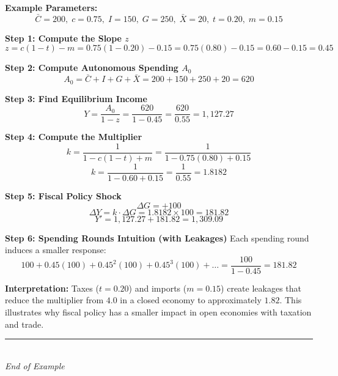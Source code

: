 \documentclass[12pt]{article}
\begin{document}
\textbf{Example Parameters:}
\[
\bar{C} = 200, \; c = 0.75, \; I = 150, \; G = 250, \; \bar{X} = 20, \; t = 0.20, \; m = 0.15
\]

\textbf{Step 1: Compute the Slope \( z \)}
\[
z = c(1 - t) - m = 0.75(1 - 0.20) - 0.15 = 0.75(0.80) - 0.15 = 0.60 - 0.15 = \boxed{0.45}
\]

\textbf{Step 2: Compute Autonomous Spending \( A_0 \)}
\[
A_0 = \bar{C} + I + G + \bar{X} = 200 + 150 + 250 + 20 = \boxed{620}
\]

\textbf{Step 3: Find Equilibrium Income}
\[
Y = \frac{A_0}{1 - z} = \frac{620}{1 - 0.45} = \frac{620}{0.55} = \boxed{1{,}127.27}
\]

\textbf{Step 4: Compute the Multiplier}
\[
k = \frac{1}{1 - c(1-t) + m} = \frac{1}{1 - 0.75(0.80) + 0.15}
\]
\[
k = \frac{1}{1 - 0.60 + 0.15} = \frac{1}{0.55} = \boxed{1.8182}
\]

\textbf{Step 5: Fiscal Policy Shock}
\[
\Delta G = +100
\]
\[
\Delta Y = k \cdot \Delta G = 1.8182 \times 100 = \boxed{181.82}
\]
\[
Y' = 1{,}127.27 + 181.82 = \boxed{1{,}309.09}
\]

\textbf{Step 6: Spending Rounds Intuition (with Leakages)}
Each spending round induces a smaller response:
\[
100 + 0.45(100) + 0.45^2(100) + 0.45^3(100) + \dots = \frac{100}{1 - 0.45} = 181.82
\]

\textbf{Interpretation:}  
Taxes (\(t=0.20\)) and imports (\(m=0.15\)) create leakages that reduce the multiplier from \(4.0\) in a closed economy to approximately \(1.82\).  
This illustrates why fiscal policy has a smaller impact in open economies with taxation and trade.


\begin{center}
\rule{0.5\textwidth}{0.4pt}\\
\textit{End of Example}
\end{center}
\end{document}
